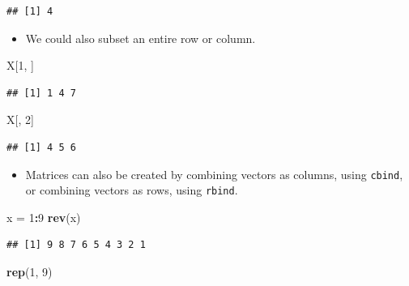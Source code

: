 \documentclass[]{book}
\newenvironment{Shaded}{\begin{snugshade}}{\end{snugshade}}
\newcommand{\KeywordTok}[1]{\textcolor[rgb]{0.13,0.29,0.53}{\textbf{#1}}}
\newcommand{\DecValTok}[1]{\textcolor[rgb]{0.00,0.00,0.81}{#1}}
\newcommand{\StringTok}[1]{\textcolor[rgb]{0.31,0.60,0.02}{#1}}
\newcommand{\OperatorTok}[1]{\textcolor[rgb]{0.81,0.36,0.00}{\textbf{#1}}}
\newcommand{\NormalTok}[1]{#1}
\providecommand{\tightlist}{%
  \setlength{\itemsep}{0pt}\setlength{\parskip}{0pt}}
\begin{document}
\begin{verbatim}
## [1] 4
\end{verbatim}

\begin{itemize}
\tightlist
\item
  We could also subset an entire row or column.
\end{itemize}

\begin{Shaded}
\begin{Highlighting}[]
\NormalTok{X[}\DecValTok{1}\NormalTok{, ]}
\end{Highlighting}
\end{Shaded}

\begin{verbatim}
## [1] 1 4 7
\end{verbatim}

\begin{Shaded}
\begin{Highlighting}[]
\NormalTok{X[, }\DecValTok{2}\NormalTok{]}
\end{Highlighting}
\end{Shaded}

\begin{verbatim}
## [1] 4 5 6
\end{verbatim}

\begin{itemize}
\tightlist
\item
  Matrices can also be created by combining vectors as columns, using
  \texttt{cbind}, or combining vectors as rows, using \texttt{rbind}.
\end{itemize}

\begin{Shaded}
\begin{Highlighting}[]
\NormalTok{x =}\StringTok{ }\DecValTok{1}\OperatorTok{:}\DecValTok{9}
\KeywordTok{rev}\NormalTok{(x)}
\end{Highlighting}
\end{Shaded}

\begin{verbatim}
## [1] 9 8 7 6 5 4 3 2 1
\end{verbatim}

\begin{Shaded}
\begin{Highlighting}[]
\KeywordTok{rep}\NormalTok{(}\DecValTok{1}\NormalTok{, }\DecValTok{9}\NormalTok{)}
\end{Highlighting}
\end{Shaded}
\end{document}
